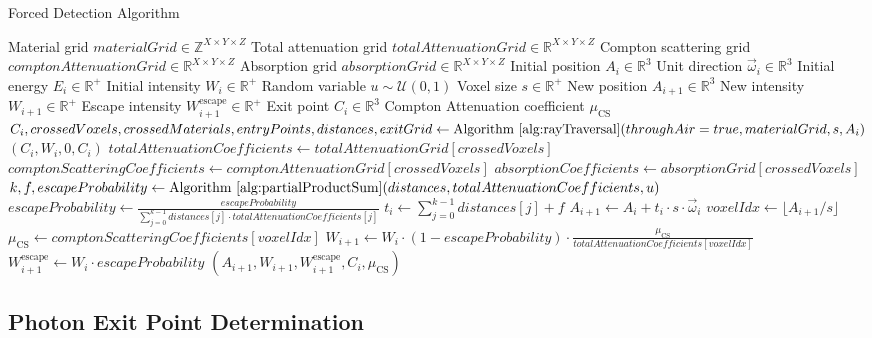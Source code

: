 \begin{algorithm}[H]
\caption{Forced Detection Algorithm}
\label{alg:forcedDetection}
\begin{algorithmic}[1]
\Require Material grid $materialGrid \in \mathbb{Z}^{X \times Y \times Z}$
\Require Total attenuation grid $totalAttenuationGrid \in \mathbb{R}^{X \times 
Y \times Z}$
\Require Compton scattering grid $comptonAttenuationGrid \in \mathbb{R}^{X 
\times Y \times Z}$
\Require Absorption grid $absorptionGrid \in \mathbb{R}^{X \times Y \times Z}$
\Require Initial position $A_i \in \mathbb{R}^3$
\Require Unit direction $\vec{\omega}_i \in \mathbb{R}^3$
\Require Initial energy $E_i \in \mathbb{R}^+$
\Require Initial intensity $W_i \in \mathbb{R}^+$
\Require Random variable $u \sim \mathcal{U}(0, 1)$
\Require Voxel size $s \in \mathbb{R}^+$
\Ensure New position $A_{i+1} \in \mathbb{R}^3$
\Ensure New intensity $W_{i+1} \in \mathbb{R}^+$
\Ensure Escape intensity $W^{\text{escape}}_{i+1} \in \mathbb{R}^+$
\Ensure Exit point $C_i \in \mathbb{R}^3$
\Ensure Compton Attenuation coefficient $\mu_{\text{CS}}$
\State $C_i, crossedVoxels, crossedMaterials, entryPoints, distances, exitGrid
\gets \text{Algorithm~\ref{alg:rayTraversal}}(throughAir = true, materialGrid,
s, A_i)$
    \State \Return $(C_i, W_i, 0, C_i)$ 
\EndIf
\State $totalAttenuationCoefficients \gets totalAttenuationGrid[crossedVoxels]$
\State $comptonScatteringCoefficients \gets comptonAttenuationGrid
[crossedVoxels]$
\State $absorptionCoefficients \gets absorptionGrid[crossedVoxels]$
\State $k, f, escapeProbability \gets \text{Algorithm~\ref{alg:partialProductSum}}
(distances, totalAttenuationCoefficients, u)$
\State $escapeProbability \gets \frac{escapeProbability}{\sum_{j=0}^{k-1} distances
[j] \cdot totalAttenuationCoefficients[j]}$
\State $t_i \gets \sum_{j=0}^{k-1} distances[j] + f$
\State $A_{i+1} \gets A_i + t_i \cdot s \cdot \vec{\omega}_i$
\State $voxelIdx \gets \lfloor A_{i+1} / s \rfloor$
\State $\mu_{\text{CS}} \gets comptonScatteringCoefficients[voxelIdx]$
\State $W_{i+1} \gets W_i \cdot (1 - escapeProbability) \cdot
\frac{\mu_{\text{CS}}}{totalAttenuationCoefficients [voxelIdx]}$
\State $W^{\text{escape}}_{i+1} \gets W_i \cdot escapeProbability$
\State \Return $(A_{i+1}, W_{i+1}, W^{\text{escape}}_{i+1}, C_i,
\mu_{\text{CS}})$
\end{algorithmic}
\end{algorithm}


\subsection{Photon Exit Point Determination}

